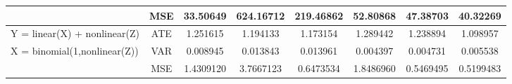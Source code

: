 \documentclass{elegantpaper}
\begin{document}
\begin{table}[H]
\begin{tabular}{llllllll}
                     & \multicolumn{1}{c}{MSE} & \multicolumn{1}{c}{33.50649} & \multicolumn{1}{c}{624.16712} & \multicolumn{1}{c}{219.46862} & \multicolumn{1}{c}{52.80868}& \multicolumn{1}{c}{47.38703} & \multicolumn{1}{c}{40.32269}\\%
    \midrule
    Y = linear(X) + nonlinear(Z) & \multicolumn{1}{c}{ATE} & \multicolumn{1}{c}{1.251615} & \multicolumn{1}{c}{1.194133} & \multicolumn{1}{c}{1.173154} & \multicolumn{1}{c}{1.289442}& \multicolumn{1}{c}{1.238894} & \multicolumn{1}{c}{1.098957}\\
    X = binomial(1,nonlinear(Z)) & \multicolumn{1}{c}{VAR} & \multicolumn{1}{c}{0.008945} & \multicolumn{1}{c}{0.013843} & \multicolumn{1}{c}{0.013961} & \multicolumn{1}{c}{0.004397}& \multicolumn{1}{c}{0.004731} & \multicolumn{1}{c}{0.005538}\\
                     & \multicolumn{1}{c}{MSE} & \multicolumn{1}{c}{1.4309120} & \multicolumn{1}{c}{3.7667123} & \multicolumn{1}{c}{0.6473534} & \multicolumn{1}{c}{1.8486960}& \multicolumn{1}{c}{0.5469495} & \multicolumn{1}{c}{0.5199483}\\%
    \midrule
    \end{tabular}%
  \label{tab:reg}%
\end{table}%
\end{document}
